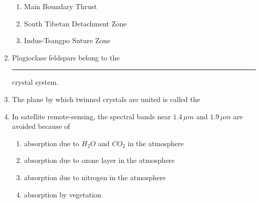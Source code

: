 \documentclass[12pt,fleqn]{article}
\theoremstyle{remark}
\begin{document}
\begin{enumerate}[label=Q.\arabic*.]
\begin{enumerate}
                \item Main Boundary Thrust
                \item South Tibetan Detachment Zone
                \item Indus-Tsangpo Suture Zone                
            \end{enumerate}
    \item Plagioclase feldspars belong to the \rule{2.5cm}{0.15mm} crystal system. \hfill{} 
        \begin {enumerate}
            \end{enumerate}
    \item The plane by which twinned crystals are united is called the \hfill{} 
        \begin {enumerate}
            \end{enumerate}
    \item In satellite remote-sensing, the spectral bands near $1.4\,\mu m$ and $1.9\,\mu m$ are avoided because of \hfill{} 
        \begin{enumerate}
                \item absorption due to $H_2O$ and $CO_2$ in the atmosphere
                \item absorption due to ozone layer in the atmosphere
                \item absorption due to nitrogen in the atmosphere
                \item absorption by vegetation               
            \end{enumerate}

\end{enumerate}
\end{document}
